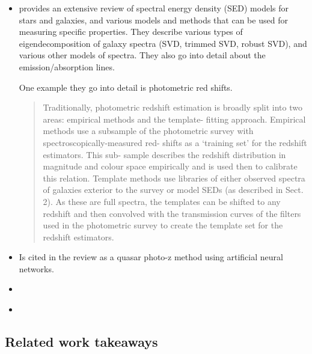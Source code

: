 \documentclass[11pt]{article}
\begin{document}
\begin{itemize}
\item \cite{walcher2011fitting} provides an extensive review of spectral energy density (SED) models for stars and galaxies, and various models and methods that can be used for measuring specific properties.  They describe various types of eigendecomposition of galaxy spectra (SVD, trimmed SVD, robust SVD), and various other models of spectra.  They also go into detail about the emission/absorption lines.  

One example they go into detail is photometric red shifts.  

\begin{quote}
Traditionally, photometric redshift estimation is broadly split into two areas: empirical methods and the template- fitting approach. Empirical methods use a subsample of the photometric survey with spectroscopically-measured red- shifts as a ‘training set’ for the redshift estimators. This sub- sample describes the redshift distribution in magnitude and colour space empirically and is used then to calibrate this relation. Template methods use libraries of either observed spectra of galaxies exterior to the survey or model SEDs (as described in Sect. 2). As these are full spectra, the templates can be shifted to any redshift and then convolved with the transmission curves of the filters used in the photometric survey to create the template set for the redshift estimators.
\end{quote}

\item \cite{ball2008robust} Is cited in the review \cite{walcher2011fitting} as a quasar photo-z method using artificial neural networks.  

\item \cite{myers2009incorporating}

\item \cite{ball2008galaxy}
\end{itemize}

\subsection{Related work takeaways}
\end{document}
